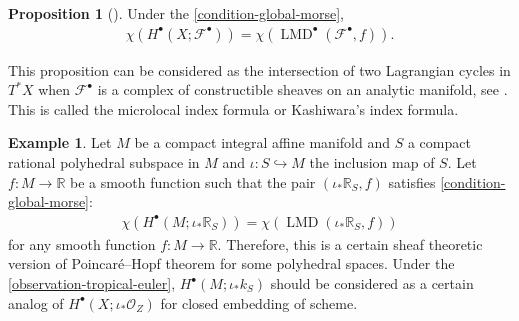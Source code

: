 \documentclass[a4paper,dvipdfmx,reqno,12pt]{amsart}
\theoremstyle{definition}
\newtheorem{example}[theorem]{Example}
\newtheorem{proposition}[theorem]{Proposition}
\newcommand{\mcal}[1]{\mathcal{#1}}%
\newcommand{\opn}[1]{\operatorname{#1}}
\newcommand{\hookto}{\hookrightarrow}
\numberwithin{equation}{section}
\begin{document}
\begin{proposition}[{\cite[Proposition 5.4.20]{MR1299726}}]
Under the \cref{condition-global-morse}, 
\begin{align}
\chi(H^{\bullet}(X;\mathcal{F}^{\bullet}))=
\chi (\opn{LMD}^{\bullet}(\mathcal{F}^{\bullet},f)).
\end{align}

\end{proposition}
This proposition can be considered as the intersection 
of two Lagrangian cycles in $T^{*}X$ when 
$\mathcal{F}^{\bullet}$ is a complex of 
constructible sheaves on an analytic manifold,
see \cite[Corollary 9.5.2, Theorem 9.5.6]{MR1299726}.
This is called the microlocal index formula or Kashiwara's 
index formula.
\begin{example}
Let $M$ be a compact integral affine manifold and $S$  
a compact rational polyhedral subspace in $M$ and 
$\iota\colon S\hookto M$ the inclusion map of $S$. 
Let $f\colon M \to \mathbb{R}$ be a smooth function such
that the pair $(\iota_*\mathbb{R}_S,f)$ satisfies 
\cref{condition-global-morse}:
\begin{align}
\chi(H^{\bullet}(M;\iota_*\mathbb{R}_S))
=\chi(\opn{LMD}(\iota_*\mathbb{R}_S,f))
\end{align}
for any smooth function $f\colon M\to \mathbb{R}$.
Therefore, this is a certain sheaf theoretic version of 
Poincar\'e--Hopf theorem for some polyhedral spaces. Under
the \cref{observation-tropical-euler}, 
$H^{\bullet}(M;\iota_*k_S)$
 should be considered as a
certain analog of 
$H^{\bullet}(X;\iota_*\mcal{O}_Z)$ for closed embedding of 
scheme.
\end{example}
\end{document}
